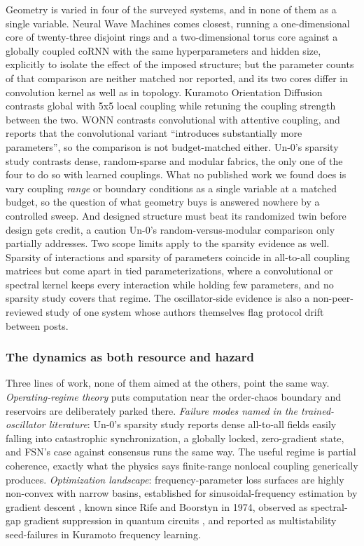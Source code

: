 \documentclass[a4paper,fleqn]{cas-sc}
\newcounter{none} %
\begin{document}
Geometry is varied in four of the surveyed systems, and in none of them
as a single variable. Neural Wave Machines \citep{keller2023} comes
closest, running a one-dimensional core of twenty-three disjoint rings
and a two-dimensional torus core against a globally coupled coRNN with
the same hyperparameters and hidden size, explicitly to isolate the
effect of the imposed structure; but the parameter counts of that
comparison are neither matched nor reported, and its two cores differ in
convolution kernel as well as in topology. Kuramoto Orientation
Diffusion contrasts global with 5x5 local coupling while retuning the
coupling strength between the two. WONN \citep{wonn} contrasts
convolutional with attentive coupling, and reports that the
convolutional variant ``introduces substantially more parameters'', so
the comparison is not budget-matched either. Un-0's sparsity study
contrasts dense, random-sparse and modular fabrics, the only one of the
four to do so with learned couplings. What no published work we found
does is vary coupling \emph{range} or boundary conditions as a single
variable at a matched budget, so the question of what geometry buys is
answered nowhere by a controlled sweep. And designed structure must beat
its randomized twin before design gets credit, a caution Un-0's
random-versus-modular comparison only partially addresses. Two scope
limits apply to the sparsity evidence as well. Sparsity of interactions
and sparsity of parameters coincide in all-to-all coupling matrices but
come apart in tied parameterizations, where a convolutional or spectral
kernel keeps every interaction while holding few parameters, and no
sparsity study covers that regime. The oscillator-side evidence is also
a non-peer-reviewed study of one system whose authors themselves flag
protocol drift between posts.

\subsubsection{The dynamics as both resource and
hazard}\label{sec-3-1-4}

Three lines of work, none of them aimed at the others, point the same
way. \emph{Operating-regime theory} puts computation near the
order-chaos boundary and reservoirs are deliberately parked there.
\emph{Failure modes named in the trained-oscillator literature}: Un-0's
sparsity study reports dense all-to-all fields easily falling into
catastrophic synchronization, a globally locked, zero-gradient state,
and FSN's case against consensus runs the same way. The useful regime is
partial coherence, exactly what the physics says finite-range nonlocal
coupling generically produces. \emph{Optimization landscape}:
frequency-parameter loss surfaces are highly non-convex with narrow
basins, established for sinusoidal-frequency estimation by gradient
descent \citep{hayes2023, turian2020}, known since Rife and Boorstyn in
1974, observed as spectral-gap gradient suppression in quantum circuits
\citep{poppel2026}, and reported as multistability seed-failures in
Kuramoto frequency learning.
\end{document}
